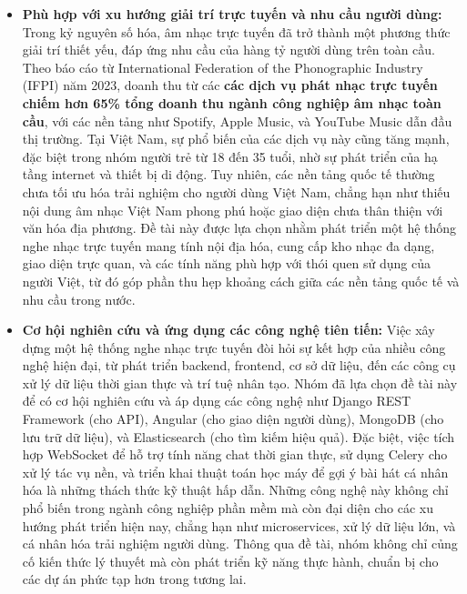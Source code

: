 \documentclass[a4paper,12pt]{report}
\begin{document}
\begin{itemize}
    \item \textbf{Phù hợp với xu hướng giải trí trực tuyến và nhu cầu người dùng:}
    Trong kỷ nguyên số hóa, âm nhạc trực tuyến đã trở thành một phương thức giải trí thiết yếu, đáp ứng nhu cầu của hàng tỷ người dùng trên toàn cầu. Theo báo cáo từ International Federation of the Phonographic Industry (IFPI) năm 2023, doanh thu từ các \textbf{các dịch vụ phát nhạc trực tuyến chiếm hơn 65\% tổng doanh thu ngành công nghiệp âm nhạc toàn cầu}, với các nền tảng như Spotify, Apple Music, và YouTube Music dẫn đầu thị trường. Tại Việt Nam, sự phổ biến của các dịch vụ này cũng tăng mạnh, đặc biệt trong nhóm người trẻ từ 18 đến 35 tuổi, nhờ sự phát triển của hạ tầng internet và thiết bị di động. Tuy nhiên, các nền tảng quốc tế thường chưa tối ưu hóa trải nghiệm cho người dùng Việt Nam, chẳng hạn như thiếu nội dung âm nhạc Việt Nam phong phú hoặc giao diện chưa thân thiện với văn hóa địa phương. Đề tài này được lựa chọn nhằm phát triển một hệ thống nghe nhạc trực tuyến mang tính nội địa hóa, cung cấp kho nhạc đa dạng, giao diện trực quan, và các tính năng phù hợp với thói quen sử dụng của người Việt, từ đó góp phần thu hẹp khoảng cách giữa các nền tảng quốc tế và nhu cầu trong nước.

    \item \textbf{Cơ hội nghiên cứu và ứng dụng các công nghệ tiên tiến:}
    Việc xây dựng một hệ thống nghe nhạc trực tuyến đòi hỏi sự kết hợp của nhiều công nghệ hiện đại, từ phát triển backend, frontend, cơ sở dữ liệu, đến các công cụ xử lý dữ liệu thời gian thực và trí tuệ nhân tạo. Nhóm đã lựa chọn đề tài này để có cơ hội nghiên cứu và áp dụng các công nghệ như Django REST Framework (cho API), Angular (cho giao diện người dùng), MongoDB (cho lưu trữ dữ liệu), và Elasticsearch (cho tìm kiếm hiệu quả). Đặc biệt, việc tích hợp WebSocket để hỗ trợ tính năng chat thời gian thực, sử dụng Celery cho xử lý tác vụ nền, và triển khai thuật toán học máy để gợi ý bài hát cá nhân hóa là những thách thức kỹ thuật hấp dẫn. Những công nghệ này không chỉ phổ biến trong ngành công nghiệp phần mềm mà còn đại diện cho các xu hướng phát triển hiện nay, chẳng hạn như microservices, xử lý dữ liệu lớn, và cá nhân hóa trải nghiệm người dùng. Thông qua đề tài, nhóm không chỉ củng cố kiến thức lý thuyết mà còn phát triển kỹ năng thực hành, chuẩn bị cho các dự án phức tạp hơn trong tương lai.


\end{itemize}
\end{document}
